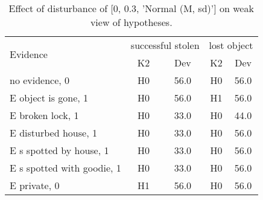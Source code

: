 \begin{table}\begin{tabular}{l|cc|cc}\toprule\multirow{2}{*}{Evidence} & \multicolumn{2}{c}{successful stolen}& \multicolumn{2}{c}{lost object}\\& {K2} & {Dev}& {K2} & {Dev}\\\midrule
no evidence, 0 & \cellcolor{Bittersweet}H0&\cellcolor{Bittersweet}56.0&\cellcolor{Bittersweet}H0&\cellcolor{Bittersweet}56.0\\E object is gone, 1 & \cellcolor{Bittersweet}H0&\cellcolor{Bittersweet}56.0&\cellcolor{Bittersweet}H1&\cellcolor{Bittersweet}56.0\\E broken lock, 1 & \cellcolor{Bittersweet}H0&\cellcolor{Bittersweet}33.0&\cellcolor{Bittersweet}H0&\cellcolor{Bittersweet}44.0\\E disturbed house, 1 & \cellcolor{Bittersweet}H0&\cellcolor{Bittersweet}33.0&\cellcolor{Bittersweet}H0&\cellcolor{Bittersweet}56.0\\E s spotted by house, 1 & \cellcolor{Bittersweet}H0&\cellcolor{Bittersweet}33.0&\cellcolor{Bittersweet}H0&\cellcolor{Bittersweet}56.0\\E s spotted with goodie, 1 & \cellcolor{Bittersweet}H0&\cellcolor{Bittersweet}33.0&\cellcolor{Bittersweet}H0&\cellcolor{Bittersweet}56.0\\E private, 0 & \cellcolor{Bittersweet}H1&\cellcolor{Bittersweet}56.0&\cellcolor{Bittersweet}H0&\cellcolor{Bittersweet}56.0\\\bottomrule\end{tabular}\caption{Effect of disturbance of [0, 0.3, 'Normal (M, sd)'] on weak view of hypotheses.}\end{table}